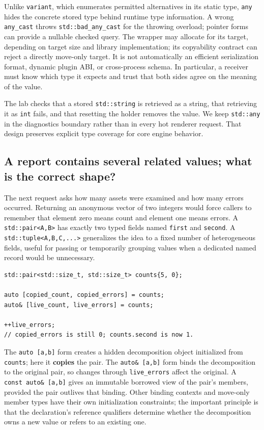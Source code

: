 Unlike \texttt{variant}, which enumerates permitted alternatives in its static type, \texttt{any} hides the concrete stored type behind runtime type information. A wrong \texttt{any\_cast} throws \texttt{std::bad\_any\_cast} for the throwing overload; pointer forms can provide a nullable checked query. The wrapper may allocate for its target, depending on target size and library implementation; its copyability contract can reject a directly move-only target. It is not automatically an efficient serialization format, dynamic plugin ABI, or cross-process schema. In particular, a receiver must know which type it expects and trust that both sides agree on the meaning of the value.

The lab checks that a stored \texttt{std::string} is retrieved as a string, that retrieving it as \texttt{int} fails, and that resetting the holder removes the value. We keep \texttt{std::any} in the diagnostics boundary rather than in every hot renderer request. That design preserves explicit type coverage for core engine behavior.

\subsection{A report contains several related values; what is the correct shape?}\label{05-engine-i-ch006-a-report-contains-several-related-values-what-is-the-correct-shape}

The next request asks how many assets were examined and how many errors occurred. Returning an anonymous vector of two integers would force callers to remember that element zero means count and element one means errors. A \texttt{std::pair\textless{}A,B\textgreater{}} has exactly two typed fields named \texttt{first} and \texttt{second}. A \texttt{std::tuple\textless{}A,B,C,...\textgreater{}} generalizes the idea to a fixed number of heterogeneous fields, useful for passing or temporarily grouping values when a dedicated named record would be unnecessary.

\begin{verbatim}
std::pair<std::size_t, std::size_t> counts{5, 0};

auto [copied_count, copied_errors] = counts;
auto& [live_count, live_errors] = counts;

++live_errors;
// copied_errors is still 0; counts.second is now 1.
\end{verbatim}

The \texttt{auto\ {[}a,b{]}} form creates a hidden decomposition object initialized from \texttt{counts}; here it \textbf{copies} the pair. The \texttt{auto\&\ {[}a,b{]}} form binds the decomposition to the original pair, so changes through \texttt{live\_errors} affect the original. A \texttt{const\ auto\&\ {[}a,b{]}} gives an immutable borrowed view of the pair's members, provided the pair outlives that binding. Other binding contexts and move-only member types have their own initialization constraints; the important principle is that the declaration's reference qualifiers determine whether the decomposition owns a new value or refers to an existing one.

